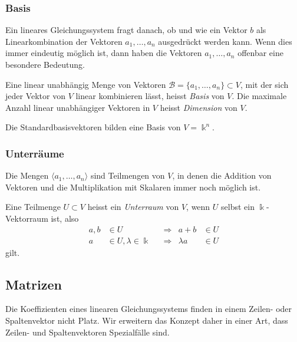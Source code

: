 \subsubsection{Basis}
Ein lineares Gleichungssystem fragt danach, ob und wie ein Vektor $b$ als
Linearkombination der Vektoren $a_1,\dots,a_n$ ausgedrückt werden kann.
Wenn dies immer eindeutig möglich ist, dann haben die Vektoren $a_1,\dots,a_n$
offenbar eine besondere Bedeutung.

\begin{definition}
%
%
Eine linear unabhängig Menge von Vektoren
$\mathcal{B}=\{a_1,\dots,a_n\}\subset V$,
mit der sich jeder Vektor von $V$ linear kombinieren lässt,
heisst {\em Basis} von $V$.
Die maximale Anzahl linear unabhängiger Vektoren in $V$ heisst
{\em Dimension} von $V$.
\end{definition}

Die Standardbasisvektoren bilden eine Basis von $V=\Bbbk^n$.

\subsubsection{Unterräume}
Die Mengen $\langle a_1,\dots,a_n\rangle$ sind Teilmengen
von $V$, in denen die Addition von Vektoren und die Multiplikation mit
Skalaren immer noch möglich ist.

\begin{definition}
Eine Teilmenge $U\subset V$ heisst ein {\em Unterraum} von $V$, wenn
%
$U$ selbst ein $\Bbbk$-Vektorraum ist, also
\[
\begin{aligned}
a,b&\in U &&\Rightarrow &a+b&\in U
\\
a&\in U, \lambda\in\Bbbk &&\Rightarrow & \lambda a&\in U
\end{aligned}
\]
gilt.
\end{definition}

%
%
\subsection{Matrizen
\label{buch:grundlagen:subsection:matrizen}}
Die Koeffizienten eines linearen Gleichungssystems finden in einem
Zeilen- oder Spaltenvektor nicht Platz.
Wir erweitern das Konzept daher in einer Art, dass Zeilen- und
Spaltenvektoren Spezialfälle sind.

